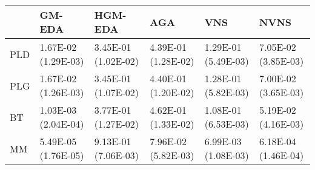 \begin{tabular}{llllll}
\toprule
{} &               GM-EDA &              HGM-EDA &                  AGA &                  VNS &                 NVNS \\
\midrule
PLD &  1.67E-02 (1.29E-03) &  3.45E-01 (1.02E-02) &  4.39E-01 (1.28E-02) &  1.29E-01 (5.49E-03) &  7.05E-02 (3.85E-03) \\
PLG &  1.67E-02 (1.26E-03) &  3.45E-01 (1.07E-02) &  4.40E-01 (1.20E-02) &  1.28E-01 (5.82E-03) &  7.00E-02 (3.65E-03) \\
BT  &  1.03E-03 (2.04E-04) &  3.77E-01 (1.27E-02) &  4.62E-01 (1.33E-02) &  1.08E-01 (6.53E-03) &  5.19E-02 (4.16E-03) \\
MM  &  5.49E-05 (1.76E-05) &  9.13E-01 (7.06E-03) &  7.96E-02 (5.82E-03) &  6.99E-03 (1.08E-03) &  6.18E-04 (1.46E-04) \\
\bottomrule
\end{tabular}
